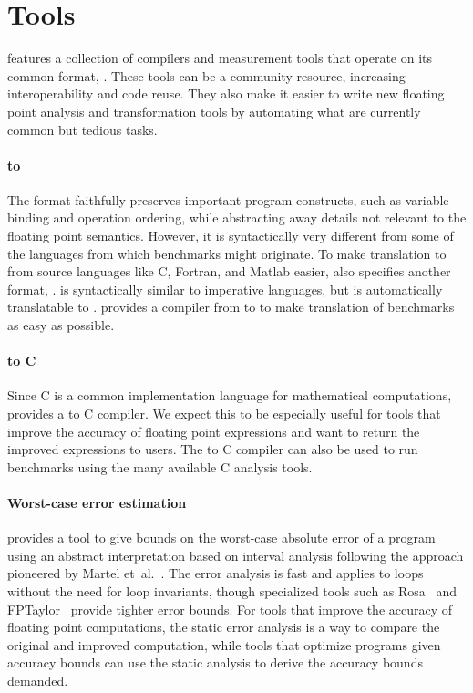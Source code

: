 \documentclass[main.tex]{subfiles}
\begin{document}
\section{Tools}
\label{sec:tools}

\name features
  a collection of compilers and measurement tools
  that operate on its common format, \core.
These tools can be a community resource,
  increasing interoperability and code reuse.
They also make it easier to write
  new floating point analysis and transformation tools
  by automating what are currently
  common but tedious tasks.

\paragraph{\surface to \core}
The \core format faithfully preserves important program constructs,
  such as variable binding and operation ordering,
  while abstracting away details not relevant
  to the floating point semantics.
However, it is syntactically very different
  from some of the languages from which benchmarks might originate.
To make translation to \core from source languages
  like C, Fortran, and Matlab easier,
  \name also specifies another format,
  \surface.
\surface is syntactically similar to imperative languages,
  but is automatically translatable to \core.
\name provides a compiler from \surface to \core
  to make translation of benchmarks as easy as possible.

\paragraph{\core to C}
Since C is a common implementation language for mathematical computations,
  \name provides a \core to C compiler.
We expect this to be especially useful for tools
  that improve the accuracy of floating point expressions
  and want to return the improved expressions to users.
The \core to C compiler can also be used
  to run \name benchmarks
  using the many available C analysis tools.

\paragraph{Worst-case error estimation}
\name provides a tool to give bounds on
  the worst-case absolute error of a \core program
  using an abstract interpretation based on interval analysis
  following the approach pioneered by Martel et~al.~\cite{martel-ai}.
The error analysis is fast
  and applies to loops without the need for loop invariants,
  though specialized tools such as Rosa~\cite{DarulovaK14}
  and FPTaylor~\cite{fptaylor-fm15}
  provide tighter error bounds.
For tools that improve the accuracy of floating point computations,
  the static error analysis is a way to compare
  the original and improved computation,
  while tools that optimize programs given accuracy bounds
  can use the static analysis to derive the accuracy bounds demanded.
\end{document}
